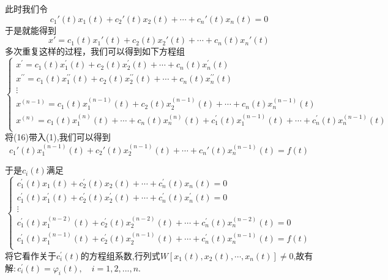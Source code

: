 \documentclass[aspectratio=169, 10pt, utf8, mathserif]{beamer}
\begin{document}
	\begin{frame}
		此时我们令
		\begin{equation}
			c_1'(t)x_1(t)+c_2'(t)x_2(t)+\cdots+c_n'(t)x_n(t)=0
		\end{equation}
		于是就能得到
		\begin{equation*}
			x'=c_1(t)x_1'(t)+c_2(t)x_2'(t)+\cdots+c_n(t)x_n'(t)
		\end{equation*}
		多次重复这样的过程，我们可以得到如下方程组
		\begin{equation}
			\begin{cases}
				x^{\prime}=c_1(t)x_{1}^{\prime}(t)+c_2(t)x_{2}^{\prime}(t)+\cdots +c_n(t)x_{n}^{\prime}(t)\\
				x^{\prime\prime}=c_1(t)x_{1}^{\prime\prime}(t)+c_2(t)x_{2}^{\prime\prime}(t)+\cdots +c_n(t)x_{n}^{\prime\prime}(t)\\
				\vdots\\
				x^{(n-1)}=c_1(t)x_{1}^{(n-1)}(t)+c_2(t)x_{2}^{(n-1)}(t)+\cdots +c_n(t)x_{n}^{(n-1)}\left( t \right)\\
				x^{(n)}=c_1(t)x_{1}^{(n)}(t)+\cdots +c_n(t)x_{n}^{(n)}(t)+c_{1}^{\prime}(t)x_{1}^{(n-1)}(t)+\cdots +c_{n}^{\prime}(t)x_{n}^{(n-1)}(t)\\
			\end{cases}
		\end{equation}
		将(16)带入(1),我们可以得到
		\begin{equation*}
			c_1'(t)x_1^{(n-1)}(t)+c_2'(t)x_2^{(n-1)}(t)+\cdots+c_n'(t)x_n^{(n-1)}(t)=f(t)
		\end{equation*}
	\end{frame}
	\begin{frame}
		于是$c_{i}(t)$满足
		\begin{equation}
			\begin{cases}
				c_{1}^{\prime}(t)x_1(t)+c_{2}^{\prime}(t)x_2(t)+\cdots +c_{n}^{\prime}(t)x_n(t)=0\\
				c_{1}^{\prime}(t)x_{1}^{\prime}(t)+c_{2}^{\prime}(t)x_{2}^{\prime}(t)+\cdots +c_{n}^{\prime}(t)x_{n}^{\prime}(t)=0\\
				\vdots\\
				c_{1}^{\prime}(t)x_{1}^{(n-2)}(t)+c_{2}^{\prime}(t)x_{2}^{(n-2)}(t)+\cdots +c_{n}^{\prime}(t)x_{n}^{(n-2)}(t)=0\\
				c_{1}^{\prime}(t)x_{1}^{(n-1)}(t)+c_{2}^{\prime}(t)x_{2}^{(n-1)}(t)+\cdots +c_{n}^{\prime}(t)x_{n}^{(n-1)}(t)=f(t)\\
			\end{cases}
		\end{equation}
		将它看作关于$c_i^{\prime}(t)$的方程组系数,行列式$W[x_1(t),x_2(t),\cdots,x_n(t)]\neq0$,故有解$:c_i^{\prime}(t)=\varphi_i(t),\quad i=1,2,...,n.$
	\end{frame}
\end{document}
